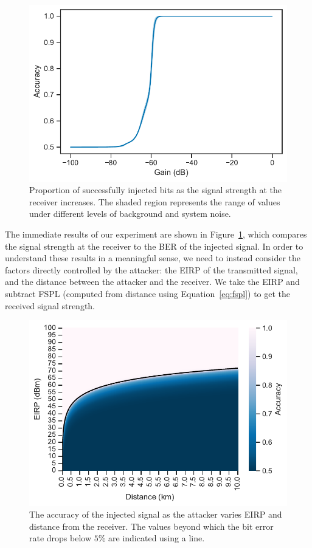 \begin{figure}
    \centering
    \includegraphics[width=\columnwidth]{diagrams/overshadowing_accuracy.pdf}
    \caption{Proportion of successfully injected bits as the signal strength at the receiver increases. The shaded region represents the range of values under different levels of background and system noise.}
    \label{fig:overshadowing_accuracy}
\end{figure}

The immediate results of our experiment are shown in Figure~\ref{fig:overshadowing_accuracy}, which compares the signal strength at the receiver to the BER of the injected signal.
In order to understand these results in a meaningful sense, we need to instead consider the factors directly controlled by the attacker: the EIRP of the transmitted signal, and the distance between the attacker and the receiver.
We take the EIRP and subtract FSPL (computed from distance using Equation~\ref{eq:fspl}) to get the received signal strength.

\begin{figure}
    \centering
    \includegraphics[width=\columnwidth]{diagrams/distance_eirp_heatmap_95.pdf}
    \caption{The accuracy of the injected signal as the attacker varies EIRP and distance from the receiver. The values beyond which the bit error rate drops below $5$\% are indicated using a line.}
    \label{fig:distance_eirp}
\end{figure}

